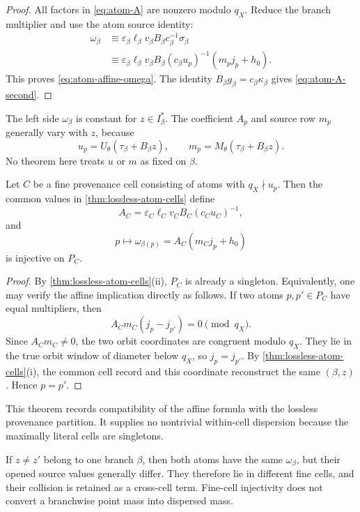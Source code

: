 \begin{proof}
All factors in \eqref{eq:atom-A} are nonzero modulo \(q_X\).
Reduce the branch multiplier and use the atom source identity:
\begin{align*}
 \omega_\beta
 &\equiv
 \varepsilon_\beta\ell_\beta v_\beta B_\beta
 c_\beta^{-1}\sigma_\beta\\
 &\equiv
 \varepsilon_\beta\ell_\beta v_\beta B_\beta
 (c_\beta u_p)^{-1}(m_pj_p+h_0).
\end{align*}
This proves \eqref{eq:atom-affine-omega}.  The identity
\(B_\beta g_\beta=c_\beta\kappa_\beta\) gives
\eqref{eq:atom-A-second}.
\end{proof}

\begin{remark}[Dependence on \(z\)]
The left side \(\omega_\beta\) is constant for
\(z\in I_\beta^\ast\).  The coefficient \(A_p\) and source row
\(m_p\) generally vary with \(z\), because
\[
 u_p=U_\theta(\tau_\beta+B_\beta z),\qquad
 m_p=M_\theta(\tau_\beta+B_\beta z).
\]
No theorem here treats \(u\) or \(m\) as fixed on \(\beta\).
\end{remark}

\begin{theorem}
\label{thm:fine-cell-injectivity}
Let \(C\) be a fine provenance cell consisting of atoms with
\(q_X\nmid u_p\).  Then the common values in
\cref{thm:lossless-atom-cells} define
\[
 A_C=
 \varepsilon_C\ell_Cv_CB_C(c_Cu_C)^{-1},
\]
and
\begin{equation}
 p\longmapsto\omega_{\beta(p)}
 =
 A_C(m_Cj_p+h_0)
\label{eq:fine-cell-map}
\end{equation}
is injective on \(P_C\).
\end{theorem}

\begin{proof}
By \cref{thm:lossless-atom-cells}(ii), \(P_C\) is already a
singleton.  Equivalently, one may verify the affine implication
directly as follows.
If two atoms \(p,p'\in P_C\) have equal multipliers, then
\[
 A_Cm_C(j_p-j_{p'})=0\pmod{q_X}.
\]
Since \(A_Cm_C\ne0\), the two orbit coordinates are congruent
modulo \(q_X\).  They lie in the true orbit window of diameter below
\(q_X\), so \(j_p=j_{p'}\).  By
\cref{thm:lossless-atom-cells}(i), the common cell record and this
coordinate reconstruct the same \((\beta,z)\).  Hence \(p=p'\).
\end{proof}

\begin{remark}
This theorem records compatibility of the affine formula with the
lossless provenance partition.  It supplies no nontrivial
within-cell dispersion because the maximally literal cells are
singletons.
\end{remark}

\begin{remark}
If \(z\ne z'\) belong to one branch \(\beta\), then both atoms have
the same \(\omega_\beta\), but their opened source values generally
differ.  They therefore lie in different fine cells, and their
collision is retained as a cross-cell term.  Fine-cell injectivity
does not convert a branchwise point mass into dispersed mass.
\end{remark}
